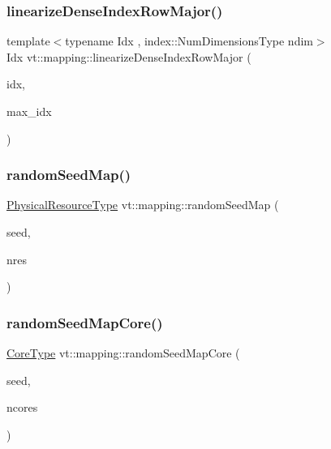 \subsubsection{\texorpdfstring{linearize\+Dense\+Index\+Row\+Major()}{linearizeDenseIndexRowMajor()}}
{\footnotesize\ttfamily template$<$typename Idx , index\+::\+Num\+Dimensions\+Type ndim$>$ \\
Idx vt\+::mapping\+::linearize\+Dense\+Index\+Row\+Major (\begin{DoxyParamCaption}\item[{\hyperlink{namespacevt_ac016d9c31465ce11c14eab2be11f9183}{Dense\+Index}$<$ Idx, ndim $>$ $\ast$}]{idx,  }\item[{\hyperlink{namespacevt_ac016d9c31465ce11c14eab2be11f9183}{Dense\+Index}$<$ Idx, ndim $>$ $\ast$}]{max\+\_\+idx }\end{DoxyParamCaption})}

\mbox{\label{namespacevt_1_1mapping_ab517203040d5d053a2293de5ea58bcf1}} 
\subsubsection{\texorpdfstring{random\+Seed\+Map()}{randomSeedMap()}}
{\footnotesize\ttfamily \hyperlink{namespacevt_a2dc36fcada816dc6d11774d650328ee9}{Physical\+Resource\+Type} vt\+::mapping\+::random\+Seed\+Map (\begin{DoxyParamCaption}\item[{\hyperlink{namespacevt_ae2e13198bdef4d5b8e603d6c1c7f0969}{Seed\+Type}}]{seed,  }\item[{\hyperlink{namespacevt_a2dc36fcada816dc6d11774d650328ee9}{Physical\+Resource\+Type}}]{nres }\end{DoxyParamCaption})}

\mbox{\label{namespacevt_1_1mapping_a35fdd9ccfcee759a8c0ba29b5c61d2a5}} 
\subsubsection{\texorpdfstring{random\+Seed\+Map\+Core()}{randomSeedMapCore()}}
{\footnotesize\ttfamily \hyperlink{namespacevt_a74b11b22c02feaabab8591acc87c7c52}{Core\+Type} vt\+::mapping\+::random\+Seed\+Map\+Core (\begin{DoxyParamCaption}\item[{\hyperlink{namespacevt_ae2e13198bdef4d5b8e603d6c1c7f0969}{Seed\+Type}}]{seed,  }\item[{\hyperlink{namespacevt_a74b11b22c02feaabab8591acc87c7c52}{Core\+Type}}]{ncores }\end{DoxyParamCaption})}

